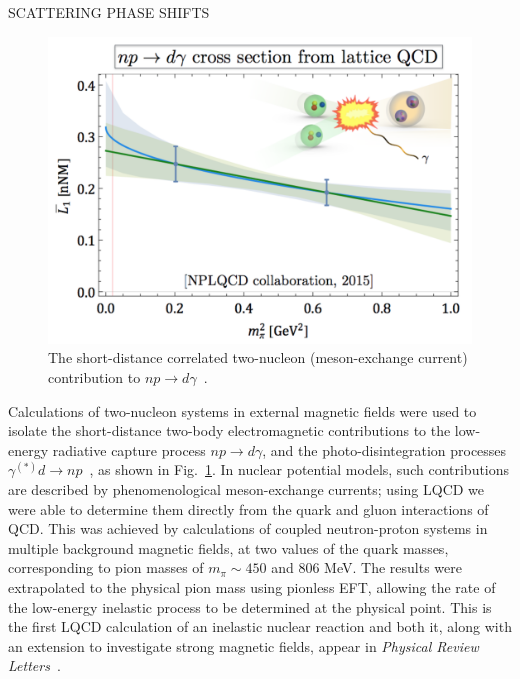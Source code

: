 SCATTERING PHASE SHIFTS





\begin{figure}
	\centering
	\includegraphics[width=0.48\columnwidth]{figures/npTOdgamma.png}  
	\caption{ 
		The short-distance correlated two-nucleon (meson-exchange current)
		contribution to $np\rightarrow d\gamma$~\protect\cite{Beane:2015yha}.    
	}
	\label{fig:L1bar}
	\vspace*{-0.4cm}
\end{figure}
%
Calculations of two-nucleon systems in external magnetic fields were used to isolate the
short-distance two-body electromagnetic contributions to the low-energy radiative capture process $np\rightarrow d\gamma$,
and the photo-disintegration processes $\gamma^{(*)}d\rightarrow np$~\cite{Beane:2015yha},
as shown in Fig.~\ref{fig:L1bar}. 
In nuclear potential models, such contributions are described by 
phenomenological meson-exchange currents; using LQCD we were able to determine them directly from the quark and gluon interactions of QCD.
This was achieved by calculations of coupled neutron-proton systems in multiple background magnetic fields, at two values of the 
quark masses, corresponding to pion masses of $m_\pi\sim 450$ and 806 MeV. The results were extrapolated to the physical pion mass using pionless EFT, allowing the rate of the low-energy inelastic process to be determined 
at the physical point. 
%
%
This is the first LQCD calculation of an inelastic nuclear reaction and both it, along with an extension to investigate strong magnetic fields, appear 
in {\it Physical Review Letters}~\cite{Beane:2015yha,Detmold:2015daa}. 




